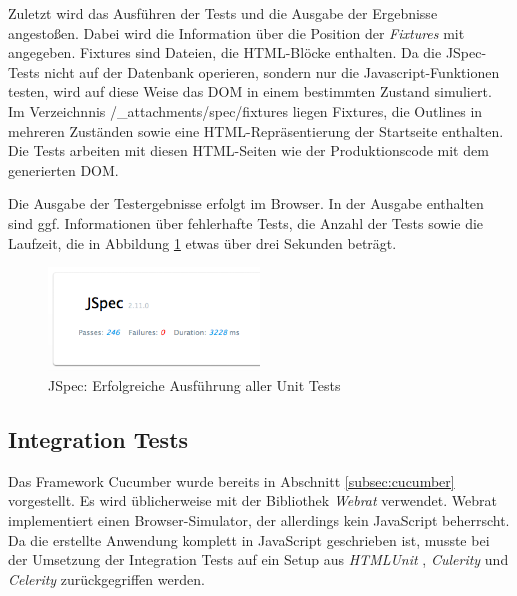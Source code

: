 Zuletzt wird das Ausführen der Tests und die Ausgabe der Ergebnisse angestoßen. Dabei wird die Information über die Position der \textit{Fixtures} mit angegeben. Fixtures sind Dateien, die HTML-Blöcke enthalten. Da die JSpec-Tests nicht auf der Datenbank operieren, sondern nur die Javascript-Funktionen testen, wird auf diese Weise das DOM in einem bestimmten Zustand simuliert. Im Verzeichnnis {\selectfont /\_attachments/spec/fixtures} liegen Fixtures, die Outlines in mehreren Zuständen sowie eine HTML-Repräsentierung der Startseite enthalten. Die Tests arbeiten mit diesen HTML-Seiten wie der Produktionscode mit dem generierten DOM. 

Die Ausgabe der Testergebnisse erfolgt im Browser. In der Ausgabe enthalten sind ggf. Informationen über fehlerhafte Tests, die Anzahl der Tests sowie die Laufzeit, die in Abbildung \ref{fig:jspec-good} etwas über drei Sekunden beträgt.

\medskip
\begin{figure}[ht] 
  \begin{center}
    \includegraphics[width=0.5\textwidth]{grafik/jspec-example-good} 
  \end{center}
  \caption{JSpec: Erfolgreiche Ausführung aller Unit Tests}
  \label{fig:jspec-good} 
\end{figure}





\subsection{Integration Tests}
\label{subsec:integrationtests}

Das Framework Cucumber wurde bereits in Abschnitt \ref{subsec:cucumber} vorgestellt. Es wird üblicherweise mit der Bibliothek \textit{Webrat} \cite{webrat:website} verwendet. Webrat implementiert einen Browser-Simulator, der allerdings kein JavaScript beherrscht. Da die erstellte Anwendung komplett in JavaScript geschrieben ist, musste bei der Umsetzung der Integration Tests auf ein Setup aus \textit{HTMLUnit} \cite{htmlunit:website}, \textit{Culerity} \cite{celerity:website} und \textit{Celerity} \cite{culerity:website} zurückgegriffen werden. 

